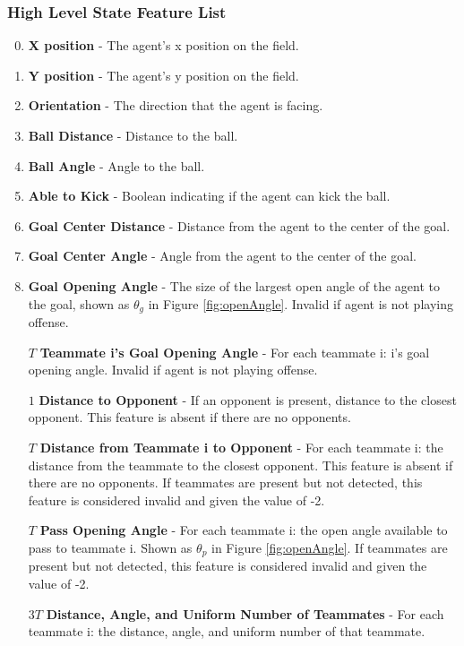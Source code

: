 \documentclass[12pt]{article}
\begin{document}
\subsubsection{High Level State Feature List}
\begin{enumerate}
\setcounter{enumi}{-1}
\item{\textbf{X position} - The agent’s x position on the field.}
\item{\textbf{Y position} - The agent’s y position on the field.}
\item{\textbf{Orientation} - The direction that the agent is facing.}
\item{\textbf{Ball Distance} - Distance to the ball.}
\item{\textbf{Ball Angle} - Angle to the ball.}
\item{\textbf{Able to Kick} - Boolean indicating if the agent can kick the ball.}
\item{\textbf{Goal Center Distance} - Distance from the agent to the center of the goal.}
\item{\textbf{Goal Center Angle} - Angle from the agent to the center of the goal.}
\item{\textbf{Goal Opening Angle} - The size of the largest open angle
  of the agent to the goal, shown as $\theta_g$ in Figure
  \ref{fig:openAngle}. Invalid if agent is not playing offense.}
\item [$T$] {\textbf{Teammate i's Goal Opening Angle} - For each
  teammate i: i’s goal opening angle. Invalid if agent is not playing
  offense.}
\item [$1$] {\textbf{Distance to Opponent} - If an opponent is present,
  distance to the closest opponent. This feature is absent if there
  are no opponents.}
\item [$T$] {\textbf{Distance from Teammate i to Opponent} - For each
  teammate i: the distance from the teammate to the closest
  opponent. This feature is absent if there are no opponents. If
  teammates are present but not detected, this feature is considered
  invalid and given the value of -2.}
\item [$T$] {\textbf{Pass Opening Angle} - For each teammate i: the open
  angle available to pass to teammate i. Shown as $\theta_p$ in Figure
  \ref{fig:openAngle}. If teammates are present but not detected, this
  feature is considered invalid and given the value of -2.}
\item [$3T$] {\textbf{Distance, Angle, and Uniform Number of
    Teammates} - For each teammate i: the distance, angle, and uniform
  number of that teammate.}
\end{enumerate}
\end{document}
